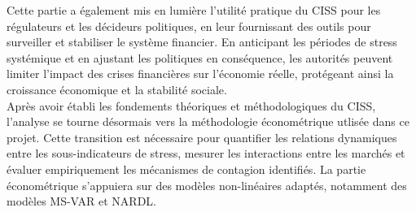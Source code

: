 \begin{sloppypar}
Cette partie a également mis en lumière l’utilité pratique du CISS pour les régulateurs et les décideurs politiques, en leur fournissant des outils pour surveiller et stabiliser le système financier. En anticipant les périodes de stress systémique et en ajustant les politiques en conséquence, les autorités peuvent limiter l’impact des crises financières sur l’économie réelle, protégeant ainsi la croissance économique et la stabilité sociale.\\

Après avoir établi les fondements théoriques et méthodologiques du CISS, l’analyse se tourne désormais vers la méthodologie économétrique utlisée dans ce projet. Cette transition est nécessaire pour quantifier les relations dynamiques entre les sous-indicateurs de stress, mesurer les interactions entre les marchés et évaluer empiriquement les mécanismes de contagion identifiés. La partie économétrique s’appuiera sur des modèles non-linéaires adaptés, notamment des modèles MS-VAR et NARDL.

\end{sloppypar}

